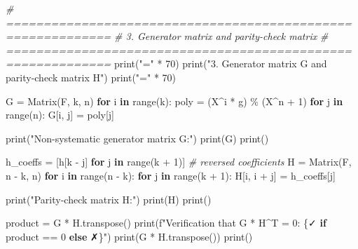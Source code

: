 \documentclass[
]{article}
\newenvironment{Shaded}{}{}
\newcommand{\BuiltInTok}[1]{\textcolor[rgb]{0.00,0.50,0.00}{#1}}
\newcommand{\CommentTok}[1]{\textcolor[rgb]{0.38,0.63,0.69}{\textit{#1}}}
\newcommand{\ControlFlowTok}[1]{\textcolor[rgb]{0.00,0.44,0.13}{\textbf{#1}}}
\newcommand{\DecValTok}[1]{\textcolor[rgb]{0.25,0.63,0.44}{#1}}
\newcommand{\KeywordTok}[1]{\textcolor[rgb]{0.00,0.44,0.13}{\textbf{#1}}}
\newcommand{\NormalTok}[1]{#1}
\newcommand{\OperatorTok}[1]{\textcolor[rgb]{0.40,0.40,0.40}{#1}}
\newcommand{\SpecialCharTok}[1]{\textcolor[rgb]{0.25,0.44,0.63}{#1}}
\newcommand{\SpecialStringTok}[1]{\textcolor[rgb]{0.73,0.40,0.53}{#1}}
\newcommand{\StringTok}[1]{\textcolor[rgb]{0.25,0.44,0.63}{#1}}
\begin{document}
\begin{Shaded}
\begin{Highlighting}[]
\CommentTok{\# ============================================================}
\CommentTok{\# 3. Generator matrix and parity{-}check matrix}
\CommentTok{\# ============================================================}
\BuiltInTok{print}\NormalTok{(}\StringTok{"="} \OperatorTok{*} \DecValTok{70}\NormalTok{)}
\BuiltInTok{print}\NormalTok{(}\StringTok{"3. Generator matrix G and parity{-}check matrix H"}\NormalTok{)}
\BuiltInTok{print}\NormalTok{(}\StringTok{"="} \OperatorTok{*} \DecValTok{70}\NormalTok{)}

\NormalTok{G }\OperatorTok{=}\NormalTok{ Matrix(F, k, n)}
\ControlFlowTok{for}\NormalTok{ i }\KeywordTok{in} \BuiltInTok{range}\NormalTok{(k):}
\NormalTok{    poly }\OperatorTok{=}\NormalTok{ (X}\OperatorTok{\^{}}\NormalTok{i }\OperatorTok{*}\NormalTok{ g) }\OperatorTok{\%}\NormalTok{ (X}\OperatorTok{\^{}}\NormalTok{n }\OperatorTok{+} \DecValTok{1}\NormalTok{)}
    \ControlFlowTok{for}\NormalTok{ j }\KeywordTok{in} \BuiltInTok{range}\NormalTok{(n):}
\NormalTok{        G[i, j] }\OperatorTok{=}\NormalTok{ poly[j]}

\BuiltInTok{print}\NormalTok{(}\StringTok{"Non{-}systematic generator matrix G:"}\NormalTok{)}
\BuiltInTok{print}\NormalTok{(G)}
\BuiltInTok{print}\NormalTok{()}

\NormalTok{h\_coeffs }\OperatorTok{=}\NormalTok{ [h[k }\OperatorTok{{-}}\NormalTok{ j] }\ControlFlowTok{for}\NormalTok{ j }\KeywordTok{in} \BuiltInTok{range}\NormalTok{(k }\OperatorTok{+} \DecValTok{1}\NormalTok{)]  }\CommentTok{\# reversed coefficients}
\NormalTok{H }\OperatorTok{=}\NormalTok{ Matrix(F, n }\OperatorTok{{-}}\NormalTok{ k, n)}
\ControlFlowTok{for}\NormalTok{ i }\KeywordTok{in} \BuiltInTok{range}\NormalTok{(n }\OperatorTok{{-}}\NormalTok{ k):}
    \ControlFlowTok{for}\NormalTok{ j }\KeywordTok{in} \BuiltInTok{range}\NormalTok{(k }\OperatorTok{+} \DecValTok{1}\NormalTok{):}
\NormalTok{        H[i, i }\OperatorTok{+}\NormalTok{ j] }\OperatorTok{=}\NormalTok{ h\_coeffs[j]}

\BuiltInTok{print}\NormalTok{(}\StringTok{"Parity{-}check matrix H:"}\NormalTok{)}
\BuiltInTok{print}\NormalTok{(H)}
\BuiltInTok{print}\NormalTok{()}

\NormalTok{product }\OperatorTok{=}\NormalTok{ G }\OperatorTok{*}\NormalTok{ H.transpose()}
\BuiltInTok{print}\NormalTok{(}\SpecialStringTok{f"Verification that G * H\^{}T = 0: }\SpecialCharTok{\{}\StringTok{\textquotesingle{}✓\textquotesingle{}} \ControlFlowTok{if}\NormalTok{ product }\OperatorTok{==} \DecValTok{0} \ControlFlowTok{else} \StringTok{\textquotesingle{}✗\textquotesingle{}}\SpecialCharTok{\}}\SpecialStringTok{"}\NormalTok{)}
\BuiltInTok{print}\NormalTok{(G }\OperatorTok{*}\NormalTok{ H.transpose())}
\BuiltInTok{print}\NormalTok{()}


\end{Highlighting}
\end{Shaded}
\end{document}
